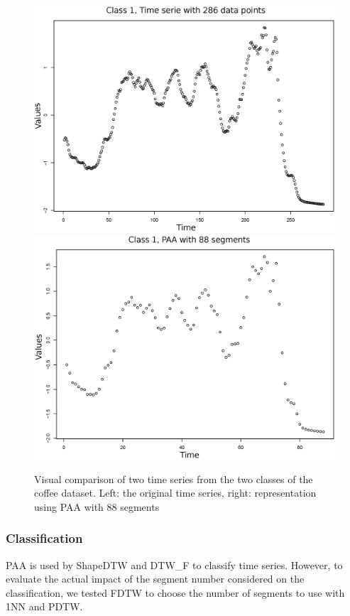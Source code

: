 \begin{figure}[h]
\includegraphics[scale=0.23]{images/coffee_1_ts}\includegraphics[scale=0.23]{images/coffee_1_paa_88}

\caption{Visual comparison of two time series from the two classes of the coffee dataset. Left: the original time series, right:  representation using PAA with 88 segments}

\label{coffee}
\end{figure}


\subsubsection{Classification}

PAA is used by ShapeDTW \cite{zhao2016shapedtw} and DTW\_F \cite{Kate2016} to classify time series. However, to evaluate the actual impact of the segment number considered on the classification, we tested FDTW to choose the
number of segments to use with 1NN and PDTW. 


